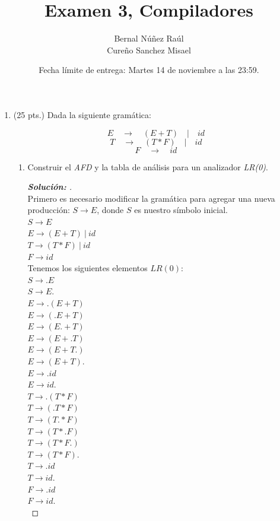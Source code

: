\documentclass{article}
\title{Examen 3, Compiladores}
\author{
Bernal Núñez Raúl \\
Cureño Sanchez Misael
}
\date{Fecha límite de entrega: Martes 14 de noviembre a las 23:59.}
\begin{document}
\maketitle
\begin{enumerate}
    \item (25 pts.) Dada la siguiente gramática:
    
    $$E \quad \rightarrow \quad (E + T) \quad | \quad \textit{id} $$
    $$T \quad \rightarrow \quad (T * F) \quad | \quad \textit{id} $$
    $$F \quad \rightarrow \quad \textit{id} $$
    
    \begin{enumerate}
        \item Construir el \textit{AFD} y la tabla de análisis para un analizador \textit{LR(0)}.
        \begin{proof}[\textbf{Solución: }]
            \quad \\

            Primero es necesario modificar la gramática para agregar una nueva producción: $S \rightarrow E$, donde $S$ es nuestro símbolo inicial.\\

            $S \rightarrow E$\\
            $E  \rightarrow  (E + T)\  |\  \textit{id} $\\
            $T  \rightarrow  (T * F)\  |\  \textit{id} $\\
            $F  \rightarrow  \textit{id} $\\

            Tenemos los siguientes elementos $LR(0)$:\\

            $S \rightarrow .E$\\
            $S \rightarrow E.$\\
            $E \rightarrow .(E+T)$\\
            $E \rightarrow (.E+T)$\\
            $E \rightarrow (E.+T)$\\
            $E \rightarrow (E+.T)$\\
            $E \rightarrow (E+T.)$\\
            $E \rightarrow (E+T).$\\
            $E \rightarrow .id$\\
            $E \rightarrow id.$\\
            $T \rightarrow .(T*F)$\\
            $T \rightarrow (.T*F)$\\
            $T \rightarrow (T.*F)$\\
            $T \rightarrow (T*.F)$\\
            $T \rightarrow (T*F.)$\\
            $T \rightarrow (T*F).$\\
            $T \rightarrow .id$\\
            $T \rightarrow id.$\\
            $F \rightarrow .id$\\
            $F \rightarrow id.$\\



\end{proof}
\end{enumerate}
\end{enumerate}
\end{document}

